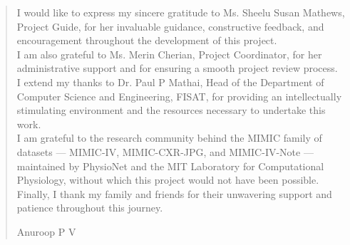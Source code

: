 \documentclass{fisatprojectfinal}
\begin{document}
\newpage
\renewcommand\abstractname{ACKNOWLEDGMENT}
\thispagestyle{plain}
\begin{abstract}
	\vspace{1cm}
	I would like to express my sincere gratitude to Ms. Sheelu Susan Mathews, Project Guide, for
her invaluable guidance, constructive feedback, and encouragement throughout the
development of this project. \\
I am also grateful to Ms. Merin Cherian, Project Coordinator, for her administrative support
and for ensuring a smooth project review process. \\ 
I extend my thanks to Dr. Paul P Mathai, Head of the Department of Computer Science and
Engineering, FISAT, for providing an intellectually stimulating environment and the
resources necessary to undertake this work. \\
I am grateful to the research community behind the MIMIC family of datasets — MIMIC-IV,
MIMIC-CXR-JPG, and MIMIC-IV-Note — maintained by PhysioNet and the MIT
Laboratory for Computational Physiology, without which this project would not have been
possible. \\
Finally, I thank my family and friends for their unwavering support and patience throughout
this journey.
	\vspace{1cm}
	\begin{flushright}
		Anuroop P V
	\end{flushright}
\end{abstract}
\newpage

\thispagestyle{empty}

\restoregeometry

\newpage



\thispagestyle{empty}

\setcounter{page}{0}

\tableofcontents


\thispagestyle{empty}

\newpage


\cleardoublepage


\thispagestyle{empty}


\listoffigures

\thispagestyle{empty}

\newpage


\cleardoublepage

\end{document}
